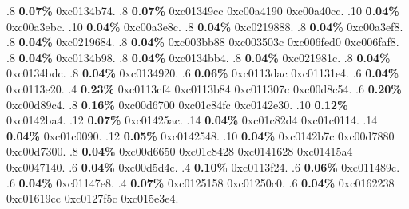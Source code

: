 \begin{profile}
{.8 \textbf{0.07\%} 0xc0134b74. 
.8 \textbf{0.07\%} 0xc01349cc\newline {} 0xc00a4190\newline {} 0xc00a40cc. 
.10 \textbf{0.04\%} 0xc00a3ebc. 
.10 \textbf{0.04\%} 0xc00a3e8c. 
.8 \textbf{0.04\%} 0xc0219888. 
.8 \textbf{0.04\%} 0xc00a3ef8. 
.8 \textbf{0.04\%} 0xc0219684. 
.8 \textbf{0.04\%} 0xc003bb88\newline {} 0xc003503c\newline {} 0xc006fed0\newline {} 0xc006faf8. 
.8 \textbf{0.04\%} 0xc0134b98. 
.8 \textbf{0.04\%} 0xc0134bb4. 
.8 \textbf{0.04\%} 0xc021981c. 
.8 \textbf{0.04\%} 0xc0134bdc. 
.8 \textbf{0.04\%} 0xc0134920. 
.6 \textbf{0.06\%} 0xc0113dac\newline {} 0xc01131e4. 
.6 \textbf{0.04\%} 0xc0113e20. 
.4 \textbf{0.23\%} 0xc0113cf4\newline {} 0xc0113b84\newline {} 0xc011307c\newline {} 0xc00d8c54. 
.6 \textbf{0.20\%} 0xc00d89c4. 
.8 \textbf{0.16\%} 0xc00d6700\newline {} 0xc01c84fc\newline {} 0xc0142e30. 
.10 \textbf{0.12\%} 0xc0142ba4. 
.12 \textbf{0.07\%} 0xc01425ac. 
.14 \textbf{0.04\%} 0xc01c82d4\newline {} 0xc01c0114. 
.14 \textbf{0.04\%} 0xc01c0090. 
.12 \textbf{0.05\%} 0xc0142548. 
.10 \textbf{0.04\%} 0xc0142b7c\newline {} 0xc00d7880\newline {} 0xc00d7300. 
.8 \textbf{0.04\%} 0xc00d6650\newline {} 0xc01c8428\newline {} 0xc0141628\newline {} 0xc01415a4\newline {} 0xc0047140. 
.6 \textbf{0.04\%} 0xc00d5d4c. 
.4 \textbf{0.10\%} 0xc0113f24. 
.6 \textbf{0.06\%} 0xc011489c. 
.6 \textbf{0.04\%} 0xc01147e8. 
.4 \textbf{0.07\%} 0xc0125158\newline {} 0xc01250c0. 
.6 \textbf{0.04\%} 0xc0162238\newline {} 0xc01619cc\newline {} 0xc0127f5c\newline {} 0xc015e3e4. 
}
\end{profile}
